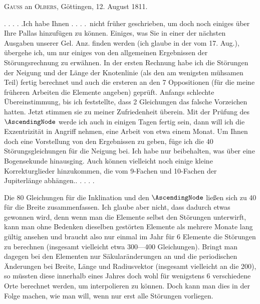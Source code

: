 \par{}\bigskip
\begin{center}
\textsc{Gauss} an \textsc{Olbers}, Göttingen, 12. August 1811.
\end{center}
\noindent\hspace*{\parindent}. . . . .\quad Ich habe Ihnen . . . .\ nicht früher geschrieben, um doch noch einiges über Ihre Pallas hinzufügen zu können. Einiges, was Sie in einer der nächsten Ausgaben unserer Gel. Anz. finden werden\HistoricalNoteEight{Band VI, S. 327.]} (ich glaube in der vom 17. Aug.), übergehe ich, um nur einiges von den allgemeinen Ergebnissen der Störungsrechnung zu erwähnen. In der ersten Rechnung habe ich die Störungen der Neigung und der Länge der Knotenlinie (als den am wenigsten mühsamen Teil) fertig berechnet und auch die ersteren an den 7 Oppositionen (für die meine früheren Arbeiten die Elemente angeben) geprüft. Anfangs schlechte Übereinstimmung, bis ich feststellte, dass 2 Gleichungen das falsche Vorzeichen hatten. Jetzt stimmen sie zu meiner Zufriedenheit überein. Mit der Prüfung des \(\AscendingNode\) werde ich auch in einigen Tagen fertig sein, dann will ich die Exzentrizität in Angriff nehmen, eine Arbeit von etwa einem Monat. Um Ihnen doch eine Vorstellung von den Ergebnissen zu geben, füge ich die 40 Störungsgleichungen für die Neigung bei. Ich habe nur beibehalten, was über eine Bogensekunde hinausging. Auch können vielleicht noch einige kleine Korrekturglieder hinzukommen, die vom 9-Fachen und 10-Fachen der Jupiterlänge abhängen\HistoricalNoteDouble{Hier folgen die auf S. 518 dieses Bandes angegebenen Glieder von \(\delta i\).]}.\quad . . . . .
\par
Die 80 Gleichungen für die Inklination und den \(\AscendingNode\) ließen sich zu 40 für die Breite zusammenfassen. Ich glaube aber nicht, dass dadurch etwas gewonnen wird, denn wenn man die Elemente selbst den Störungen unterwirft, kann man ohne Bedenken dieselben gestörten Elemente als mehrere Monate lang gültig ansehen und braucht also nur einmal im Jahr für 6 Elemente die Störungen zu berechnen (insgesamt vielleicht etwa 300—400 Gleichungen). Bringt man dagegen bei den Elementen nur Säkularänderungen an und die periodischen Änderungen bei Breite, Länge und Radiusvektor (insgesamt vielleicht an die 200), so müssten diese innerhalb eines Jahres doch wohl für wenigstens 6 verschiedene Orte berechnet werden, um interpolieren zu können. Doch kann man dies in der Folge machen, wie man will, wenn nur erst alle Störungen  vorliegen.
\par

